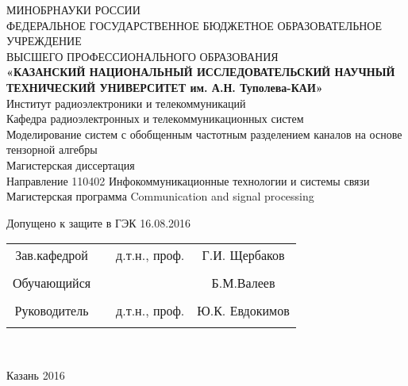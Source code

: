  
\begin{center}
\hfill \break
\large{МИНОБРНАУКИ РОССИИ}\\
\footnotesize{ФЕДЕРАЛЬНОЕ ГОСУДАРСТВЕННОЕ БЮДЖЕТНОЕ ОБРАЗОВАТЕЛЬНОЕ УЧРЕЖДЕНИЕ}\\ 
\footnotesize{ВЫСШЕГО ПРОФЕССИОНАЛЬНОГО ОБРАЗОВАНИЯ}\\
\small{\textbf{«КАЗАНСКИЙ НАЦИОНАЛЬНЫЙ ИССЛЕДОВАТЕЛЬСКИЙ НАУЧНЫЙ ТЕХНИЧЕСКИЙ УНИВЕРСИТЕТ им. А.Н. Туполева-КАИ»}}\\
\hfill \break
\normalsize{Институт радиоэлектроники и телекоммуникаций}\\
 \hfill \break
\normalsize{Кафедра радиоэлектронных и телекоммуникационных систем}\\
\hfill\break
\hfill \break
\hfill \break
\hfill \break
\large{Моделирование систем с обобщенным частотным разделением каналов на основе тензорной алгебры}\\
\hfill \break
\hfill \break
\hfill \break
\normalsize{Магистерская диссертация\\
\hfill \break
Направление  110402 Инфокоммуникационные технологии и системы связи
\hfill \break
Магистерская программа  Communication and signal processing  }\\
\hfill \break
\hfill \break
\end{center}
 
\normalsize{ \hspace{28pt} Допущено к защите в ГЭК  16.08.2016} \hfill \break
\hfill \break
 
\normalsize{ 
\begin{tabular}{cccc}
Зав.кафедрой & \underline{\hspace{3cm}} &  д.т.н.,  проф. & Г.И. Щербаков \\\\
Обучающийся & \underline{\hspace{3cm}} & &Б.М.Валеев \\\\
Руководитель & \underline{\hspace{3cm}}& д.т.н., проф.&  Ю.К. Евдокимов \\\\
\end{tabular}
}\\
\hfill \break
\hfill \break
\begin{center} Казань 2016 \end{center}
\thispagestyle{empty} %
 
 
\newpage
